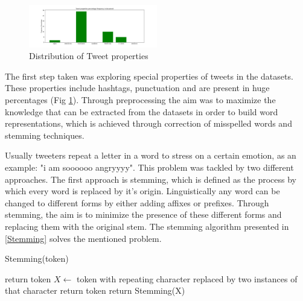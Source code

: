 \documentclass[10pt,conference,compsocconf]{IEEEtran}
\begin{document}
\begin{figure}[!htb]
	\centering \includegraphics[width=0.5\textwidth]{../plots/types.png}
	\caption{Distribution of Tweet properties}
	\label{prop}
\end{figure}

The first step taken was exploring special properties of tweets in the datasets. These properties include hashtags, punctuation and are present in huge percentages (Fig \ref{prop}). Through preprocessing the aim was to maximize the knowledge that can be extracted from the datasets in order to build word representations, which is achieved through correction of misspelled words and stemming techniques.

Usually tweeters repeat a letter in a word to stress on a certain emotion, as an example: "i am soooooo angryyyy". This problem was tackled by two different approaches. The first approach is stemming, which is defined as the process by which every word is replaced by it's origin. Linguistically any word can be changed to different forms by either adding affixes or prefixes. Through stemming, the aim is to minimize the presence of these different forms and replacing them with the original stem. The stemming algorithm presented in \ref{Stemming} solves the mentioned problem.

\begin{algorithm}
\caption{Stemming(token)}
\label{Stemming}
\begin{algorithmic} 
\STATE return token
\ELSE
\STATE $X \leftarrow $ token with repeating character replaced by two instances of that character
\STATE return token
\ELSE
\STATE return Stemming(X)
\ENDIF
\ENDIF
\end{algorithmic}
\end{algorithm}
\end{document}
